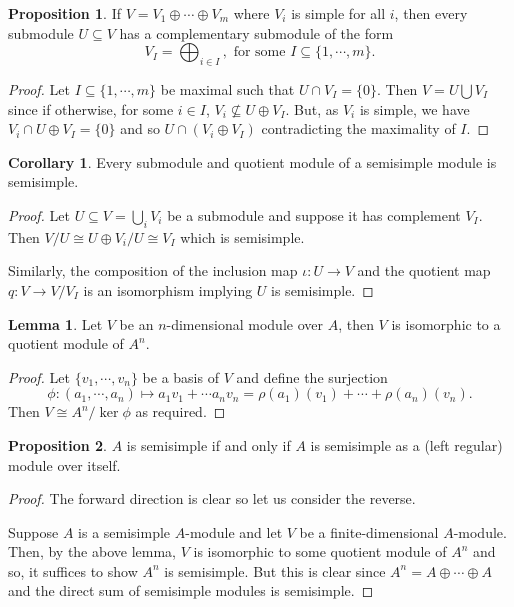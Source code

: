 \documentclass[]{article}
\theoremstyle{definition}
\newtheorem{corollary}{Corollary}[theorem]
\theoremstyle{definition}
\newtheorem{lemma}{Lemma}[section]
\newtheorem{proposition}{Proposition}[section]
\begin{document}
\begin{proposition}
  If \(V = V_1 \oplus \cdots \oplus V_m\) where \(V_i\) is simple for all \(i\), 
  then every submodule \(U \subseteq V\) has a complementary submodule of the 
  form 
  \[V_I = \bigoplus_{i \in I}, \text{ for some } I \subseteq \{1, \cdots, m\}.\]
\end{proposition}
\begin{proof}
  Let \(I \subseteq \{1, \cdots, m\}\) be maximal such that \(U \cap V_I = \{0\}\). 
  Then \(V = U \bigcup V_I\) since if otherwise, for some \(i \in I\), 
  \(V_i \not\subseteq U \oplus V_I\). But, as \(V_i\) is simple, we have
  \(V_i \cap U \oplus V_I = \{0\}\) and so \(U \cap (V_i \oplus V_I)\) contradicting 
  the maximality of \(I\).
\end{proof}

\begin{corollary}
  Every submodule and quotient module of a semisimple module is semisimple.
\end{corollary}
\begin{proof}
  Let \(U \subseteq V = \bigcup_i V_i\) be a submodule and suppose it has complement 
  \(V_I\). Then \(V / U \cong U \oplus V_i / U \cong V_I\) which is semisimple.

  Similarly, the composition of the inclusion map \(\iota : U \to V\) and the 
  quotient map \(q : V \to V / V_I\) is an isomorphism implying \(U\) is semisimple.
\end{proof}

\begin{lemma}
  Let \(V\) be an \(n\)-dimensional module over \(A\), then \(V\) is isomorphic 
  to a quotient module of \(A^n\).
\end{lemma}
\begin{proof}
  Let \(\{v_1, \cdots, v_n\}\) be a basis of \(V\) and define the surjection 
  \[\phi : (a_1, \cdots, a_n) \mapsto a_1 v_1 + \cdots a_n v_n = 
    \rho(a_1)(v_1) + \cdots + \rho(a_n)(v_n).\]
  Then \(V \cong A^n / \ker \phi\) as required.
\end{proof}

\begin{proposition}
  \(A\) is semisimple if and only if \(A\) is semisimple as a 
  (left regular) module over itself.
\end{proposition}
\begin{proof}
  The forward direction is clear so let us consider the reverse. 

  Suppose \(A\) is a semisimple \(A\)-module and let \(V\) be a finite-dimensional 
  \(A\)-module. Then, by the above lemma, \(V\) is isomorphic to 
  some quotient module of \(A^n\) and so, it suffices to show \(A^n\) is 
  semisimple. But this is clear since \(A^n = A \oplus \cdots \oplus A\) and 
  the direct sum of semisimple modules is semisimple.
\end{proof}
\end{document}
